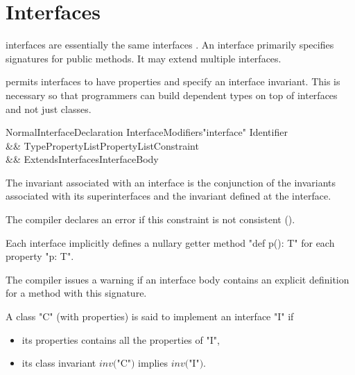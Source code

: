 \chapter{Interfaces}
\label{XtenInterfaces}

{}\XtenCurrVer{} interfaces are essentially the same \java{}
interfaces \cite[\S 9]{jls2}. An interface primarily specifies
signatures for public methods. It may extend multiple interfaces. 

\label{DepType:Interface}

\Xten{} permits interfaces to have properties and specify an interface
invariant. This is necessary so that programmers can build dependent
types on top of interfaces and not just classes.

\begin{grammar}
NormalInterfaceDeclaration \:
      InterfaceModifiers\opt \xcd"interface" Identifier  \\
   && TypePropertyList\opt PropertyList\opt Constraint\opt \\
   && ExtendsInterfaces\opt InterfaceBody \\
\end{grammar}
\noindent
The invariant associated with an interface is the conjunction of the
invariants associated with its superinterfaces and the invariant
defined at the interface. 

\begin{staticrule*}
   The compiler declares an error if this constraint
   is not consistent ().  
\end{staticrule*}

Each interface implicitly defines a nullary getter method
\xcd"def p(): T" for each property \xcd"p: T". 

\begin{staticrule*}
   The compiler issues a warning if an interface body
   contains an explicit definition for a method with this signature.
\end{staticrule*}

A class \xcd"C" (with properties) is said to implement an interface \xcd"I" if
\begin{itemize}
  \item its properties contains all the properties of \xcd"I",
\item its class invariant
$\mathit{inv}($\xcd"C"$)$ implies
$\mathit{inv}($\xcd"I"$)$.
\end{itemize}

